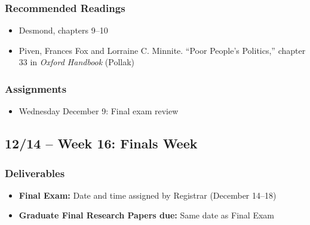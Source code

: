 \documentclass[12pt]{article}
\begin{document}
    \subsubsection*{Recommended Readings}
        \begin{itemize}
            \item Desmond, chapters 9--10
            \item Piven, Frances Fox and Lorraine C. Minnite. ``Poor People's Politics,'' chapter 33 in \emph{Oxford Handbook} (Pollak)
        \end{itemize}
    \subsubsection*{Assignments}
        \begin{itemize}
            \item Wednesday December 9: Final exam review
        \end{itemize}

\subsection*{12/14 -- Week 16: Finals Week}
    \subsubsection*{Deliverables}
        \begin{itemize}
            \item \textbf{Final Exam:} Date and time assigned by Registrar (December 14--18)
            \item \textbf{Graduate Final Research Papers due:} Same date as Final Exam
        \end{itemize}
\end{document}
